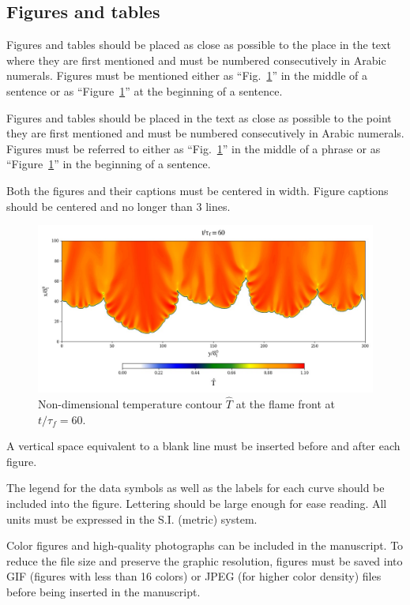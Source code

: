 \documentclass[10pt,fleqn,a4paper,twoside]{article}
\begin{document}
\subsection{Figures and tables}

Figures and tables should be placed as close as possible to the place in the text where they are first mentioned and must be numbered consecutively in Arabic numerals. Figures must be mentioned either as ``Fig.~\ref{Fig:1}'' in the middle of a sentence or as ``Figure~\ref{Fig:1}'' at the beginning of a sentence.

Figures and tables should be placed in the text as close as possible to the point they are first mentioned and must be numbered consecutively in Arabic numerals. Figures must be referred to either as ``Fig.~\ref{Fig:1}'' in the middle of a phrase or as ``Figure~\ref{Fig:1}'' in the beginning of a sentence. 

Both the figures and their captions must be centered in width. Figure captions should be centered and no longer than 3 lines. 

\begin{figure}[h!]
\centering
\includegraphics[angle=0, width=17cm]{figure.jpeg}
\caption{Non-dimensional temperature contour $\hat{T}$ at the flame front at $t/\tau_f = 60$. }
\label{Fig:1}
\end{figure}

A vertical space equivalent to a blank line must be inserted before and after each figure.

The legend for the data symbols as well as the labels for each curve should be included into the figure. Lettering should be large enough for ease reading. All units must be expressed in the S.I. (metric) system.

Color figures and high-quality photographs can be included in the manuscript. To reduce the file size and preserve the graphic resolution, figures must be saved into GIF (figures with less than 16 colors) or JPEG (for higher color density) files before being inserted in the manuscript.
\end{document}
